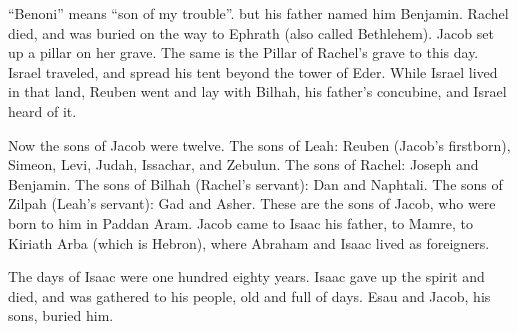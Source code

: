 {{“Benoni” means “son of my trouble”.} but his father named him Benjamin.
Rachel died, and was buried on the way to Ephrath (also called Bethlehem).
Jacob set up a pillar on her grave. The same is the Pillar of Rachel’s grave to this day.
Israel traveled, and spread his tent beyond the tower of Eder.
While Israel lived in that land, Reuben went and lay with Bilhah, his father’s concubine, and Israel heard of it.
\par }{\PP Now the sons of Jacob were twelve.
The sons of Leah: Reuben (Jacob’s firstborn), Simeon, Levi, Judah, Issachar, and Zebulun.
The sons of Rachel: Joseph and Benjamin.
The sons of Bilhah (Rachel’s servant): Dan and Naphtali.
The sons of Zilpah (Leah’s servant): Gad and Asher. These are the sons of Jacob, who were born to him in Paddan Aram.
Jacob came to Isaac his father, to Mamre, to Kiriath Arba (which is Hebron), where Abraham and Isaac lived as foreigners.
\par }{\PP {}The days of Isaac were one hundred eighty years.
Isaac gave up the spirit and died, and was gathered to his people, old and full of days. Esau and Jacob, his sons, buried him.

}
